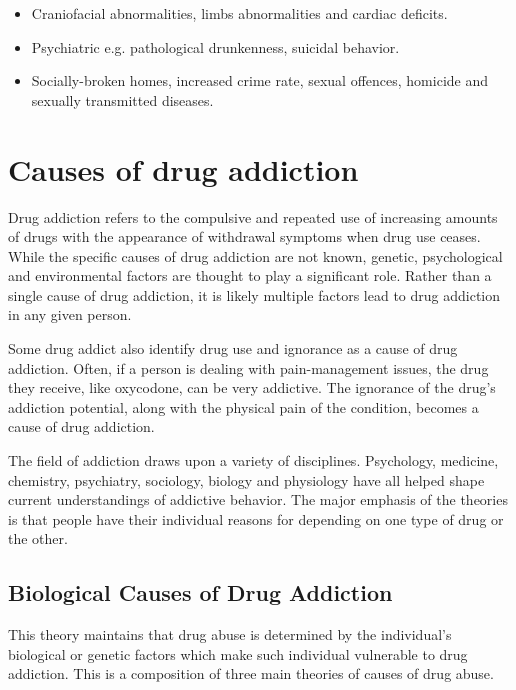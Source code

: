 \documentclass{report}
\begin{document}
\begin{itemize}
\begin{itemize}
        \item Craniofacial abnormalities, limbs abnormalities and cardiac deficits.
        
        \item Psychiatric e.g. pathological drunkenness, suicidal behavior.
        
        \item Socially-broken homes, increased crime rate, sexual offences, homicide and sexually transmitted diseases.
    \end{itemize}
    
\end{itemize}

\section{Causes of drug addiction}
Drug addiction refers to the compulsive and repeated use of increasing amounts of drugs with the appearance of withdrawal symptoms when drug use ceases. While the specific causes of drug addiction are not known, genetic, psychological and environmental factors are thought to play a significant role. Rather than a single cause of drug addiction, it is likely multiple factors lead to drug addiction in any given person.

Some drug addict also identify drug use and ignorance as a cause of drug addiction. Often, if a person is dealing with pain-management issues, the drug they receive, like oxycodone, can be very addictive. The ignorance of the drug's addiction potential, along with the physical pain of the condition, becomes a cause of drug addiction.

The field of addiction draws upon a variety of  disciplines. Psychology, medicine, chemistry, psychiatry, sociology, biology and physiology have all helped shape current understandings of addictive behavior. The major emphasis of the theories is that people have their individual reasons for depending on one type of drug or the other.

\subsection{Biological Causes of Drug Addiction}
This theory  maintains that  drug abuse is determined  by the individual’s biological or genetic factors which make  such individual vulnerable to drug addiction. This is a composition of three main theories of causes of drug abuse.
\end{document}
